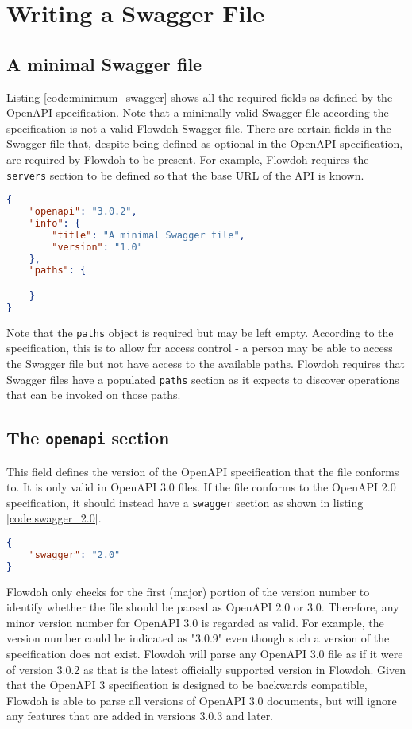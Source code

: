 \section{Writing a Swagger File}
\subsection{A minimal Swagger file}
Listing \ref{code:minimum_swagger} shows all the required fields as defined by the OpenAPI specification. Note that a minimally valid Swagger file according the specification is not a valid Flowdoh Swagger file. There are certain fields in the Swagger file that, despite being defined as optional in the OpenAPI specification, are required by Flowdoh to be present. For example, Flowdoh requires the \texttt{servers} section to be defined so that the base URL of the API is known.
\begin{lstlisting}[caption={A minimal OpenAPI 3.0 definition},label={code:minimum_swagger},language=json]
{
    "openapi": "3.0.2",
    "info": {
        "title": "A minimal Swagger file",
        "version": "1.0"
    },
    "paths": {

    }
}
\end{lstlisting}
Note that the \texttt{paths} object is required but may be left empty. According to the specification, this is to allow for access control \cite{empty_paths} - a person may be able to access the Swagger file but not have access to the available paths. Flowdoh requires that Swagger files have a populated \texttt{paths} section as it expects to discover operations that can be invoked on those paths.
\subsection{The \texttt{openapi} section}
This field defines the version of the OpenAPI specification that the file conforms to. It is only valid in OpenAPI 3.0 files. If the file conforms to the OpenAPI 2.0 specification, it should instead have a \texttt{swagger} section as shown in listing \ref{code:swagger_2.0}.
\begin{lstlisting}[caption={Alternative to the \texttt{openapi} section in OpenAPI 2.0},label={code:swagger_2.0},language=json]
{
    "swagger": "2.0"
}
\end{lstlisting}
Flowdoh only checks for the first (major) portion of the version number to identify whether the file should be parsed as OpenAPI 2.0 or 3.0. Therefore, any minor version number for OpenAPI 3.0 is regarded as valid. For example, the version number could be indicated as "3.0.9" even though such a version of the specification does not exist. Flowdoh will parse any OpenAPI 3.0 file as if it were of version 3.0.2 as that is the latest officially supported version in Flowdoh. Given that the OpenAPI 3 specification is designed to be backwards compatible, Flowdoh is able to parse all versions of OpenAPI 3.0 documents, but will ignore any features that are added in versions 3.0.3 and later.
